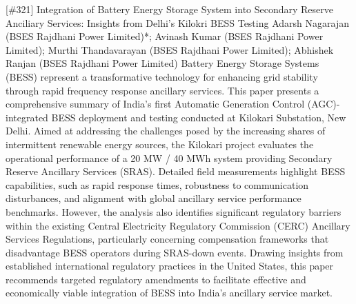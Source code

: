 {} \begin{abstract_online} {[\#321] Integration of Battery Energy Storage System into Secondary Reserve Anciliary Services: Insights from Delhi's Kilokri BESS Testing} {} {Adarsh Nagarajan (BSES Rajdhani Power Limited)*; Avinash Kumar (BSES Rajdhani Power Limited); Murthi Thandavarayan (BSES Rajdhani Power Limited); Abhishek Ranjan (BSES Rajdhani Power Limited)} {} Battery Energy Storage Systems (BESS) represent a transformative technology for enhancing grid stability through rapid frequency response ancillary services. This paper presents a comprehensive summary of India's first Automatic Generation Control (AGC)-integrated BESS deployment and testing conducted at Kilokari Substation, New Delhi. Aimed at addressing the challenges posed by the increasing shares of intermittent renewable energy sources, the Kilokari project evaluates the operational performance of a 20 MW / 40 MWh system providing Secondary Reserve Ancillary Services (SRAS). Detailed field measurements highlight BESS capabilities, such as rapid response times, robustness to communication disturbances, and alignment with global ancillary service performance benchmarks. However, the analysis also identifies significant regulatory barriers within the existing Central Electricity Regulatory Commission (CERC) Ancillary Services Regulations, particularly concerning compensation frameworks that disadvantage BESS operators during SRAS-down events. Drawing insights from established international regulatory practices in the United States, this paper recommends targeted regulatory amendments to facilitate effective and economically viable integration of BESS into India's ancillary service market. \end{abstract_online} 
